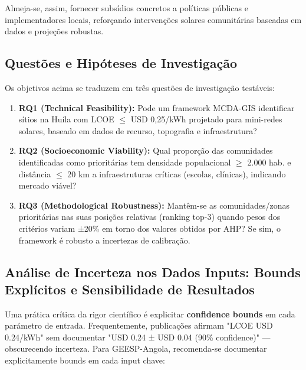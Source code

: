 \documentclass[12pt, a4paper]{article}
\begin{document}
{{{{{{{{{{{{Almeja-se, assim, fornecer subsídios concretos a políticas públicas e implementadores locais, reforçando intervenções solares comunitárias baseadas em dados e projeções robustas.

\subsection{Questões e Hipóteses de Investigação}

Os objetivos acima se traduzem em três questões de investigação testáveis:

\begin{enumerate}
\item \textbf{RQ1 (Technical Feasibility):} Pode um framework MCDA-GIS identificar sítios na Huíla com LCOE $\leq$ USD 0,25/kWh projetado para mini-redes solares, baseado em dados de recurso, topografia e infraestrutura?

\item \textbf{RQ2 (Socioeconomic Viability):} Qual proporção das comunidades identificadas como prioritárias tem densidade populacional $\geq$ 2.000 hab. e distância $\leq$ 20 km a infraestruturas críticas (escolas, clínicas), indicando mercado viável?

\item \textbf{RQ3 (Methodological Robustness):} Mantêm-se as comunidades/zonas prioritárias nas suas posições relativas (ranking top-3) quando pesos dos critérios variam ±20\% em torno dos valores obtidos por AHP? Se sim, o framework é robusto a incertezas de calibração.
\end{enumerate}

\subsection{Análise de Incerteza nos Dados Inputs: Bounds Explícitos e Sensibilidade de Resultados}

Uma prática crítica da rigor científico é explicitar \textbf{confidence bounds} em cada parámetro de entrada. Frequentemente, publicações afirmam "LCOE USD 0.24/kWh" sem documentar "USD 0.24 ± USD 0.04 (90\% confidence)" — obscurecendo incerteza. Para GEESP-Angola, recomenda-se documentar explicitamente bounds em cada input chave:

}}}}}}}}}}}}
\end{document}
